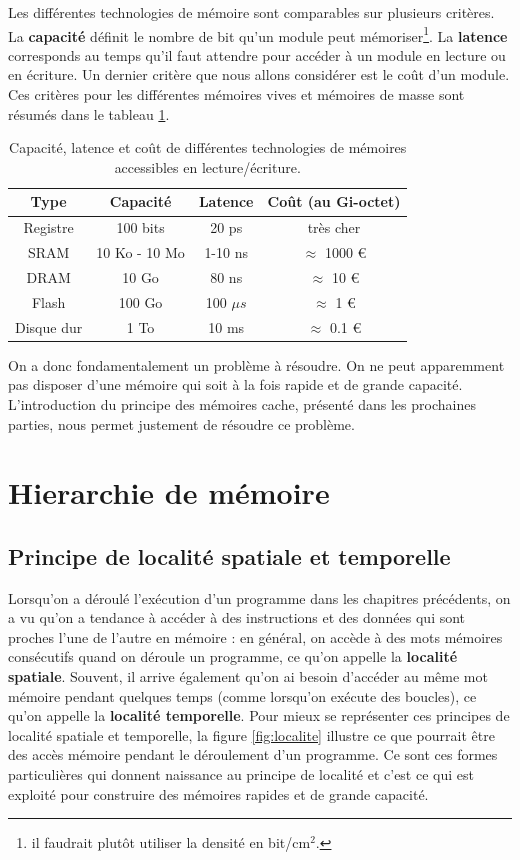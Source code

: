 Les différentes technologies de mémoire sont comparables sur plusieurs critères. La \textbf{capacité} définit le nombre de bit qu'un module peut mémoriser\footnote{il faudrait plutôt utiliser la densité en bit/cm$^2$.}. La \textbf{latence} corresponds au temps qu'il faut attendre pour accéder à un module en lecture ou en écriture. Un dernier critère que nous allons considérer est le coût d'un module. Ces critères pour les différentes mémoires vives et mémoires de masse sont résumés dans le tableau \ref{table:memory_properties}.


\begin{table}[hbtp]
\centering\begin{tabular}{cccc}
Type & Capacité & Latence & Coût (au  Gi-octet) \\
\hline
Registre & 100 bits & 20 ps & très cher\\
SRAM & 10 Ko - 10 Mo & 1-10 ns & $\approx$ 1000 \euro\\
DRAM & 10 Go & 80 ns & $\approx$ 10 \euro\\
Flash & 100 Go & 100 $\mu s$& $\approx$ 1 \euro\\
Disque dur & 1 To & 10 ms & $\approx$ 0.1 \euro
\end{tabular}
\caption{\label{table:memory_properties} Capacité, latence et coût de différentes technologies de mémoires accessibles en lecture/écriture.}
\end{table}


On a donc fondamentalement un problème à résoudre. On ne peut apparemment pas disposer d'une mémoire qui soit à la fois rapide et de grande capacité. L'introduction du principe des mémoires cache, présenté dans les prochaines parties, nous permet justement de résoudre ce problème.

\section{Hierarchie de mémoire}
\subsection{Principe de localité spatiale et temporelle}

Lorsqu'on a déroulé l'exécution d'un programme dans les chapitres précédents, on a vu qu'on a tendance à accéder à des instructions et des données qui sont proches l'une de l'autre en mémoire : en général, on accède à des mots mémoires consécutifs quand on déroule un programme, ce qu'on appelle la \textbf{localité spatiale}. Souvent, il arrive également qu'on ai besoin d'accéder au même mot mémoire pendant quelques temps (comme lorsqu'on exécute des boucles), ce qu'on appelle la \textbf{localité temporelle}. Pour mieux se représenter ces principes de localité spatiale et temporelle, la figure \ref{fig:localite} illustre ce que pourrait être des accès mémoire pendant le déroulement d'un programme. Ce sont ces formes particulières qui donnent naissance au principe de localité et c'est ce qui est exploité pour construire des mémoires rapides et de grande capacité.

